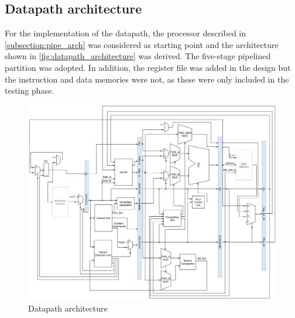 \subsection{Datapath architecture}
For the implementation of the datapath, the processor described in \autoref{subsection:pipe_arch} was considered as starting point and the architecture shown in \autoref{fig:datapath_architecture} was derived. The five-stage pipelined partition was adopted. In addition, the register file was added in the design but the instruction and data memories were not, as these were only included in the testing phase.

\begin{figure}[h]
  \center
  \includegraphics[width=1\textwidth]{sec2/images/datapath.png}
  \caption{Datapath architecture}
  \label{fig:datapath_architecture}
\end{figure}

